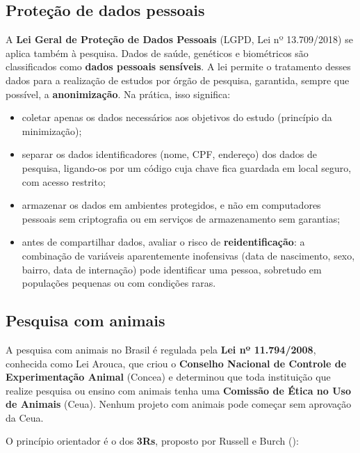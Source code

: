 \documentclass[
]{book}
\providecommand{\tightlist}{%
  \setlength{\itemsep}{0pt}\setlength{\parskip}{0pt}}
\begin{document}
\subsection{Proteção de dados pessoais}\label{proteuxe7uxe3o-de-dados-pessoais}

A \textbf{Lei Geral de Proteção de Dados Pessoais} (LGPD, Lei nº 13.709/2018) se aplica também à pesquisa. Dados de saúde, genéticos e biométricos são classificados como \textbf{dados pessoais sensíveis}. A lei permite o tratamento desses dados para a realização de estudos por órgão de pesquisa, garantida, sempre que possível, a \textbf{anonimização}. Na prática, isso significa:

\begin{itemize}
\tightlist
\item
  coletar apenas os dados necessários aos objetivos do estudo (princípio da minimização);
\item
  separar os dados identificadores (nome, CPF, endereço) dos dados de pesquisa, ligando-os por um código cuja chave fica guardada em local seguro, com acesso restrito;
\item
  armazenar os dados em ambientes protegidos, e não em computadores pessoais sem criptografia ou em serviços de armazenamento sem garantias;
\item
  antes de compartilhar dados, avaliar o risco de \textbf{reidentificação}: a combinação de variáveis aparentemente inofensivas (data de nascimento, sexo, bairro, data de internação) pode identificar uma pessoa, sobretudo em populações pequenas ou com condições raras.
\end{itemize}

\subsection{Pesquisa com animais}\label{pesquisa-com-animais}

A pesquisa com animais no Brasil é regulada pela \textbf{Lei nº 11.794/2008}, conhecida como Lei Arouca, que criou o \textbf{Conselho Nacional de Controle de Experimentação Animal} (Concea) e determinou que toda instituição que realize pesquisa ou ensino com animais tenha uma \textbf{Comissão de Ética no Uso de Animais} (Ceua). Nenhum projeto com animais pode começar sem aprovação da Ceua.

O princípio orientador é o dos \textbf{3Rs}, proposto por Russell e Burch ():
\end{document}

